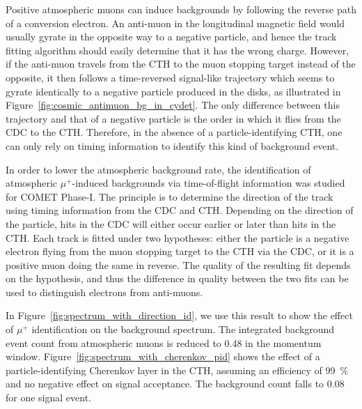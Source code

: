 Positive atmospheric muons can induce backgrounds by following the reverse path
of a conversion electron. An anti-muon in the longitudinal magnetic field would
usually gyrate in the opposite way to a negative particle, and hence the track
fitting algorithm should easily determine that it has the wrong charge. However,
if the anti-muon travels from the CTH to the muon stopping target instead of the
opposite, it then follows a time-reversed signal-like trajectory which seems to
gyrate identically to a negative particle produced in the disks, as illustrated
in Figure~\ref{fig:cosmic_antimuon_bg_in_cydet}. The only difference between
this trajectory and that of a negative particle is the order in which it flies
from the CDC to the CTH. Therefore, in the absence of a particle-identifying
CTH, one can only rely on timing information to identify this kind of background
event.

In order to lower the atmospheric background rate, the identification of
atmospheric $\mu^+$-induced backgrounds via time-of-flight information was
studied for COMET Phase\nobreakdash-I. The principle is to determine the
direction of the track using timing information from the CDC and CTH. Depending
on the direction of the particle, hits in the CDC will either occur earlier or
later than hits in the CTH. Each track is fitted under two hypotheses: either
the particle is a negative electron flying from the muon stopping target to the
CTH via the CDC, or it is a positive muon doing the same in reverse. The quality
of the resulting fit depends on the hypothesis, and thus the difference in
quality between the two fits can be used to distinguish electrons from
anti-muons.


In Figure~\ref{fig:spectrum_with_direction_id}, we use this result to show the
effect of $\mu^+$ identification on the background spectrum. The integrated
background event count from atmospheric muons is reduced to 0.48 in the momentum
window. Figure~\ref{fig:spectrum_with_cherenkov_pid} shows the effect of a
particle-identifying Cherenkov layer in the CTH, assuming an efficiency of
\SI{99}{\percent} and no negative effect on signal acceptance. The background
count falls to 0.08 for one signal event.

